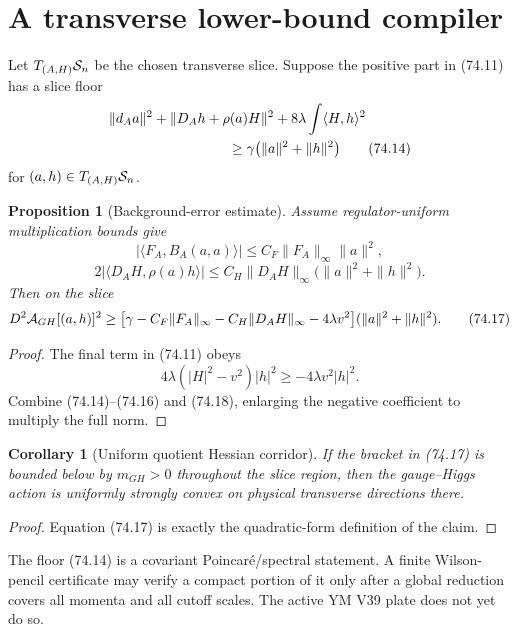 \documentclass[11pt]{article}
\newtheorem{proposition}[theorem]{Proposition}
\newtheorem{corollary}[theorem]{Corollary}
\theoremstyle{remark}
\begin{document}
\section{A transverse lower-bound compiler}

Let \(T_{(A,H)}{\cal S}_n\) be the chosen transverse slice.  Suppose
the positive part in (74.11) has a slice floor
\[
\begin{split}
 &\|d_Aa\|^2+\|D_Ah+\rho(a)H\|^2
 +8\lambda\int\langle H,h\rangle^2\\
 &\hspace{30mm}\geq
 \gamma\bigl(\|a\|^2+\|h\|^2\bigr)                   \tag{74.14}
\end{split}
\]
for \((a,h)\in T_{(A,H)}{\cal S}_n\).

\begin{proposition}[Background-error estimate]
\label{prop:v15v74-error}
Assume regulator-uniform multiplication bounds give
\[
 |\langle F_A,B_A(a,a)\rangle|
 \leq C_F\|F_A\|_\infty\|a\|^2,                       \tag{74.15}
\]
\[
 2|\langle D_AH,\rho(a)h\rangle|
 \leq
 C_H\|D_AH\|_\infty
 \bigl(\|a\|^2+\|h\|^2\bigr).                         \tag{74.16}
\]
Then on the slice
\[
\begin{split}
 D^2{\cal A}_{GH}[(a,h)]^2
 \geq
 \bigl[
 \gamma-C_F\|F_A\|_\infty-C_H\|D_AH\|_\infty
 -4\lambda v^2
 \bigr]
 (\|a\|^2+\|h\|^2).                                   \tag{74.17}
\end{split}
\]
\end{proposition}

\begin{proof}
The final term in (74.11) obeys
\[
 4\lambda(|H|^2-v^2)|h|^2
 \geq-4\lambda v^2|h|^2.                              \tag{74.18}
\]
Combine (74.14)--(74.16) and (74.18), enlarging the negative
coefficient to multiply the full norm.
\end{proof}

\begin{corollary}[Uniform quotient Hessian corridor]
\label{cor:v15v74-corridor}
If the bracket in (74.17) is bounded below by \(m_{GH}>0\)
throughout the slice region, then the gauge--Higgs action is
uniformly strongly convex on physical transverse directions there.
\end{corollary}

\begin{proof}
Equation (74.17) is exactly the quadratic-form definition of the
claim.
\end{proof}

The floor (74.14) is a covariant Poincar\'e/spectral statement.  A
finite Wilson-pencil certificate may verify a compact portion of
it only after a global reduction covers all momenta and all cutoff
scales.  The active YM V39 plate does not yet do so.
\end{document}
